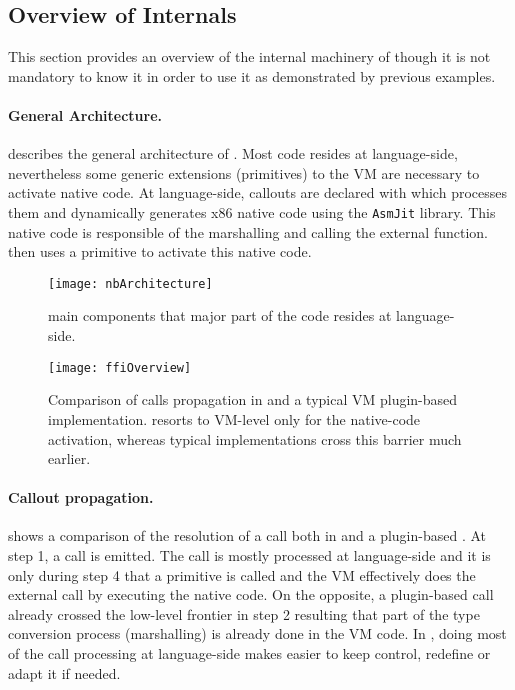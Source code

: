 \subsection{Overview of \NBFFI Internals}

This section provides an overview of the internal machinery of \NBFFI though it is not mandatory to know it in order to use it as demonstrated by previous examples.

\paragraph{General Architecture.}
 describes the general architecture of \NB.
Most code resides at language-side, nevertheless some generic extensions (primitives) to the VM are necessary to activate native code.
At language-side, callouts are declared with \NBFFI which processes them and dynamically generates x86 native code using the \texttt{AsmJit} library.
This native code is responsible of the marshalling and calling the external function.
\NB then uses a primitive to activate this native code.

\begin{figure}[h]
	\centering
	\texttt{[image: nbArchitecture]}
	\caption[\NB Components Layering]{\NB main components that major part of the code resides at language-side.}
\end{figure}

\begin{figure*}[t]
	\centering
	\texttt{[image: ffiOverview]}
	\caption[\FFI Implementation Comparison]{Comparison of \FFI calls propagation in \NBFFI and a typical VM plugin-based implementation. \NB resorts to VM-level only for the native-code activation, whereas typical implementations cross this barrier much earlier.}
\end{figure*}

\paragraph{Callout propagation.}
 shows a comparison of the resolution of a \FFI call both in \NBFFI and a plugin-based \FFI.
At step 1, a \FFI call is emitted.
The \NBFFI call is mostly processed at language-side and it is only during step 4 that a primitive is called and the VM effectively does the external call by executing the native code.
On the opposite, a plugin-based \FFI call already crossed the low-level frontier in step 2 resulting that part of the type conversion process (marshalling) is already done in the VM code.
In \NBFFI, doing most of the \FFI call processing at language-side makes easier to keep control, redefine or adapt it if needed.

